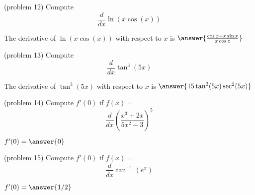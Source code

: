 \documentclass[handout]{ximera}
\begin{document}
\begin{problem}(problem 12)
  Compute
  \[
  \frac{d}{dx} \ln(x\cos (x))
  \]
  
    
		The derivative of $\ln(x\cos (x))$ with respect to $x$ is
		 $\answer{\frac{\cos x - x\sin x}{x\cos x}}$
		
\end{problem}



\begin{problem}(problem 13)
  Compute
  \[
  \frac{d}{dx} \tan^3(5x)
  \]
  
   
		The derivative of $\tan^3(5x)$ with respect to $x$ is
		 $\answer{15\tan^2(5x)\sec^2(5x)}$
		
\end{problem}



\begin{problem}(problem 14)
  Compute $f'(0)$ if $f(x)=$
  \[
  \frac{d}{dx} \left(\frac{x^3 + 2x}{5x^2 -3}\right)^5
  \]
  
 
		 $f'(0) = \answer{0}$
		
\end{problem}



\begin{problem}(problem 15)
  Compute $f'(0)$ if $f(x)=$
  \[
  \frac{d}{dx} \tan^{-1}(e^x)
  \]
  
 
		 $f'(0) = \answer{1/2}$
		
\end{problem}
\end{document}
